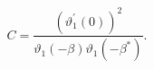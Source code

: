 \begin{equation}
  C = \frac{(\vartheta_1^{\prime }(0))^2}{\vartheta_1(-\beta)
   \vartheta_1(-\beta^{*})}.
\end{equation}

